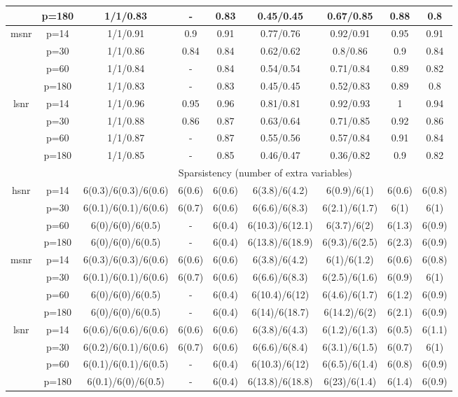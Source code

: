 \begin{table}[ht]
{\begin{tabular}{|c|c|ccccccc|}
   & p=180 & 1/1/0.83 & - & 0.83 & 0.45/0.45 & 0.67/0.85 & 0.88 & 0.8 \\ 
  \midrule\multirow{4}[2]{*}{msnr} & p=14 & 1/1/0.91 & 0.9 & 0.91 & 0.77/0.76 & 0.92/0.91 & 0.95 & 0.91 \\ 
   & p=30 & 1/1/0.86 & 0.84 & 0.84 & 0.62/0.62 & 0.8/0.86 & 0.9 & 0.84 \\ 
   & p=60 & 1/1/0.84 & - & 0.84 & 0.54/0.54 & 0.71/0.84 & 0.89 & 0.82 \\ 
   & p=180 & 1/1/0.83 & - & 0.83 & 0.45/0.45 & 0.52/0.83 & 0.89 & 0.8 \\ 
  \midrule\multirow{4}[2]{*}{lsnr} & p=14 & 1/1/0.96 & 0.95 & 0.96 & 0.81/0.81 & 0.92/0.93 & 1 & 0.94 \\ 
   & p=30 & 1/1/0.88 & 0.86 & 0.87 & 0.63/0.64 & 0.71/0.85 & 0.92 & 0.86 \\ 
   & p=60 & 1/1/0.87 & - & 0.87 & 0.55/0.56 & 0.57/0.84 & 0.91 & 0.84 \\ 
   & p=180 & 1/1/0.85 & - & 0.85 & 0.46/0.47 & 0.36/0.82 & 0.9 & 0.82 \\ 
   \midrule 
 \multicolumn{1}{|c}{} &       & \multicolumn{7}{c|}{Sparsistency (number of extra variables)} \\
\midrule\multirow{4}[2]{*}{hsnr} & p=14 & 6(0.3)/6(0.3)/6(0.6) & 6(0.6) & 6(0.6) & 6(3.8)/6(4.2) & 6(0.9)/6(1) & 6(0.6) & 6(0.8) \\ 
   & p=30 & 6(0.1)/6(0.1)/6(0.6) & 6(0.7) & 6(0.6) & 6(6.6)/6(8.3) & 6(2.1)/6(1.7) & 6(1) & 6(1) \\ 
   & p=60 & 6(0)/6(0)/6(0.5) & - & 6(0.4) & 6(10.3)/6(12.1) & 6(3.7)/6(2) & 6(1.3) & 6(0.9) \\ 
   & p=180 & 6(0)/6(0)/6(0.5) & - & 6(0.4) & 6(13.8)/6(18.9) & 6(9.3)/6(2.5) & 6(2.3) & 6(0.9) \\ 
  \midrule\multirow{4}[2]{*}{msnr} & p=14 & 6(0.3)/6(0.3)/6(0.6) & 6(0.6) & 6(0.6) & 6(3.8)/6(4.2) & 6(1)/6(1.2) & 6(0.6) & 6(0.8) \\ 
   & p=30 & 6(0.1)/6(0.1)/6(0.6) & 6(0.7) & 6(0.6) & 6(6.6)/6(8.3) & 6(2.5)/6(1.6) & 6(0.9) & 6(1) \\ 
   & p=60 & 6(0)/6(0)/6(0.5) & - & 6(0.4) & 6(10.4)/6(12) & 6(4.6)/6(1.7) & 6(1.2) & 6(0.9) \\ 
   & p=180 & 6(0)/6(0)/6(0.5) & - & 6(0.4) & 6(14)/6(18.7) & 6(14.2)/6(2) & 6(2.1) & 6(0.9) \\ 
  \midrule\multirow{4}[2]{*}{lsnr} & p=14 & 6(0.6)/6(0.6)/6(0.6) & 6(0.6) & 6(0.6) & 6(3.8)/6(4.3) & 6(1.2)/6(1.3) & 6(0.5) & 6(1.1) \\ 
   & p=30 & 6(0.2)/6(0.1)/6(0.6) & 6(0.7) & 6(0.6) & 6(6.6)/6(8.4) & 6(3.1)/6(1.5) & 6(0.7) & 6(1) \\ 
   & p=60 & 6(0.1)/6(0.1)/6(0.5) & - & 6(0.4) & 6(10.3)/6(12) & 6(6.5)/6(1.4) & 6(0.8) & 6(0.9) \\ 
   & p=180 & 6(0.1)/6(0)/6(0.5) & - & 6(0.4) & 6(13.8)/6(18.8) & 6(23)/6(1.4) & 6(1.4) & 6(0.9) \\ 
   \bottomrule 
\end{tabular}
}
\end{table}

